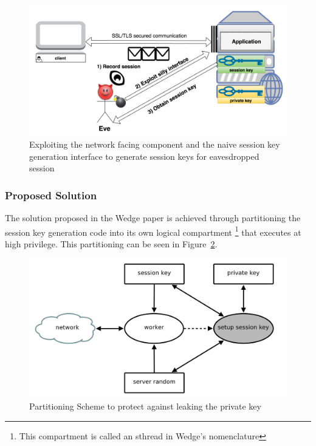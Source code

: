 \documentclass[../main.tex]{subfiles}
\begin{document}
\begin{enumerate}
    \begin{figure}[H] \centering
      \includegraphics[scale=0.15]{images/attack2.png}
      \caption{Exploiting the network facing component and the naive
        session key generation interface to generate session keys for
        eavesdropped session}
      \label{fig:attack2}
    \end{figure}
\end{enumerate}

\subsubsection*{Proposed Solution}

The solution proposed in the Wedge paper is achieved through
partitioning the session key generation code into its own logical
compartment \footnote{This compartment is called an sthread in Wedge's
  nomenclature} that executes at high privilege. This partitioning can
be seen in Figure~\ref{fig:wedge-partition}.

\begin{figure}[H]
  \centering
  \includegraphics[scale=0.25]{images/compartment_01.png}
  \caption{Partitioning Scheme to protect against leaking the private
    key~\cite{Bittau08}}
  \label{fig:wedge-partition}
\end{figure}
\end{document}
